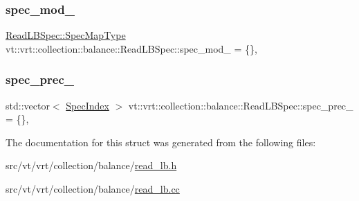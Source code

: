 \subsubsection{\texorpdfstring{spec\+\_\+mod\+\_\+}{spec\_mod\_}}
{\footnotesize\ttfamily \hyperlink{structvt_1_1vrt_1_1collection_1_1balance_1_1_read_l_b_spec_aa73c3611c615832402eeeed6fb7b8049}{Read\+L\+B\+Spec\+::\+Spec\+Map\+Type} vt\+::vrt\+::collection\+::balance\+::\+Read\+L\+B\+Spec\+::spec\+\_\+mod\+\_\+ = \{\}\hspace{0.3cm}{\ttfamily [static]}, {\ttfamily [private]}}

\mbox{\label{structvt_1_1vrt_1_1collection_1_1balance_1_1_read_l_b_spec_a53d7c8950db9d6b4d8b7d895d0a264d0}} 
\subsubsection{\texorpdfstring{spec\+\_\+prec\+\_\+}{spec\_prec\_}}
{\footnotesize\ttfamily std\+::vector$<$ \hyperlink{namespacevt_1_1vrt_1_1collection_1_1balance_a72a5e0d9936ddf57f8e6c64e0e9fd123}{Spec\+Index} $>$ vt\+::vrt\+::collection\+::balance\+::\+Read\+L\+B\+Spec\+::spec\+\_\+prec\+\_\+ = \{\}\hspace{0.3cm}{\ttfamily [static]}, {\ttfamily [private]}}



The documentation for this struct was generated from the following files\+:\begin{DoxyCompactItemize}
\item 
src/vt/vrt/collection/balance/\hyperlink{read__lb_8h}{read\+\_\+lb.\+h}\item 
src/vt/vrt/collection/balance/\hyperlink{read__lb_8cc}{read\+\_\+lb.\+cc}\end{DoxyCompactItemize}
